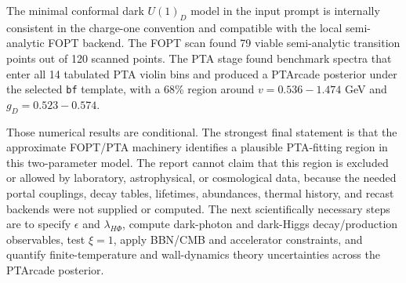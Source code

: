 \documentclass[11pt]{article}
\newcommand{\gD}{g_D}
\newcommand{\lamHP}{\lambda_{H\Phi}}
\newcommand{\eps}{\epsilon}
\begin{document}
The minimal conformal dark \(U(1)_D\) model in the input prompt is internally consistent in the charge-one convention and compatible with the local semi-analytic FOPT backend. The FOPT scan found 79 viable semi-analytic transition points out of 120 scanned points. The PTA stage found benchmark spectra that enter all 14 tabulated PTA violin bins and produced a PTArcade posterior under the selected \texttt{bf} template, with a 68\% region around \(v=0.536-1.474\) GeV and \(\gD=0.523-0.574\).

Those numerical results are conditional. The strongest final statement is that the approximate FOPT/PTA machinery identifies a plausible PTA-fitting region in this two-parameter model. The report cannot claim that this region is excluded or allowed by laboratory, astrophysical, or cosmological data, because the needed portal couplings, decay tables, lifetimes, abundances, thermal history, and recast backends were not supplied or computed. The next scientifically necessary steps are to specify \(\eps\) and \(\lamHP\), compute dark-photon and dark-Higgs decay/production observables, test \(\xi=1\), apply BBN/CMB and accelerator constraints, and quantify finite-temperature and wall-dynamics theory uncertainties across the PTArcade posterior.
\end{document}
